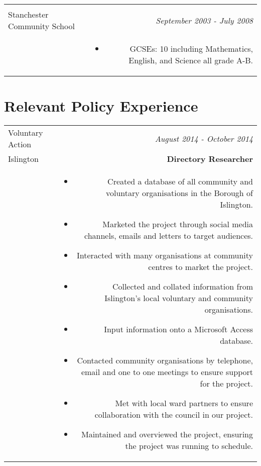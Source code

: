 \documentclass[10pt]{article}
\begin{document}
\begin{flushleft}
\begin{tabular}{L!{\VRule}R}
\begin{itemize}
\end{itemize}\\



Stanchester Community School&\textsl{September 2003 - July 2008}\\
&\vspace{-12mm} 

\begin{itemize} \itemsep1pt \parskip0pt 

\item GCSEs: 10 including Mathematics, English, and Science all grade A-B.

\end{itemize}

\end{tabular}

\section*{Relevant Policy Experience}

\begin{tabular}{L!{\VRule}R}

Voluntary Action&\textsl{August 2014 - October 2014}\\
Islington&\textbf{Directory Researcher}\\

&\vspace{-2mm}

\begin{itemize} \itemsep1pt \parskip0pt 

\item Created a database of all community and voluntary organisations in the Borough of Islington. 
\item Marketed the project through social media channels, emails and letters to target audiences.
\item Interacted with many organisations at community centres to market the project.
\item Collected and collated information from Islington’s local voluntary and community organisations.
\item Input information onto a Microsoft Access database. 
\item Contacted community organisations by telephone, email and one to one meetings to ensure support for the project. 
\item Met with local ward partners to ensure collaboration with the council in our project.
\item Maintained and overviewed the project, ensuring the project was running to schedule.


\end{itemize}
\end{tabular}
\end{flushleft}
\end{document}
